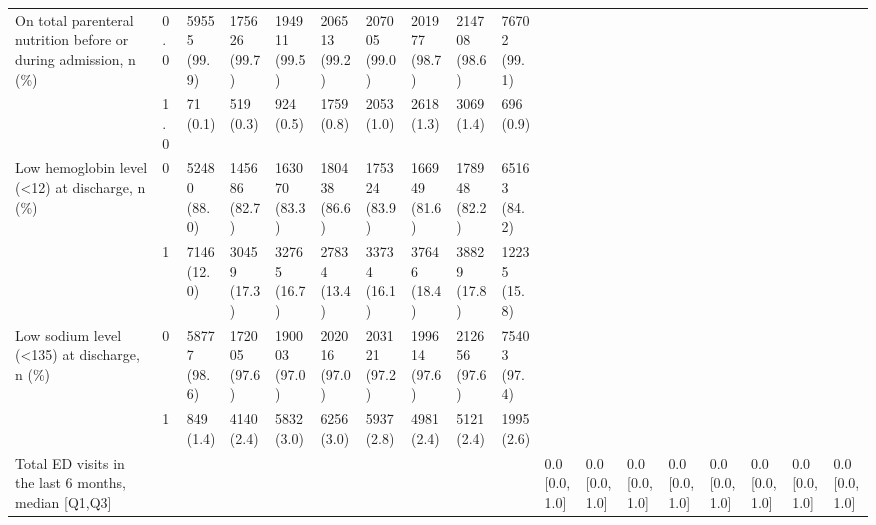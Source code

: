 \begin{tabular}{llllllllllllllllll}
On total parenteral nutrition before or during admission, n (\%) & 0.0 &                 59555 (99.9) &   175626 (99.7) &   194911 (99.5) &   206513 (99.2) &   207005 (99.0) &   201977 (98.7) &   214708 (98.6) &   76702 (99.1) &                   &                    &                    &                    &                    &                     &                     &                     \\
                                       & 1.0 &                     71 (0.1) &       519 (0.3) &       924 (0.5) &      1759 (0.8) &      2053 (1.0) &      2618 (1.3) &      3069 (1.4) &      696 (0.9) &                   &                    &                    &                    &                    &                     &                     &                     \\
Low hemoglobin level (<12) at discharge, n (\%) & 0 &                 52480 (88.0) &   145686 (82.7) &   163070 (83.3) &   180438 (86.6) &   175324 (83.9) &   166949 (81.6) &   178948 (82.2) &   65163 (84.2) &                   &                    &                    &                    &                    &                     &                     &                     \\
                                       & 1 &                  7146 (12.0) &    30459 (17.3) &    32765 (16.7) &    27834 (13.4) &    33734 (16.1) &    37646 (18.4) &    38829 (17.8) &   12235 (15.8) &                   &                    &                    &                    &                    &                     &                     &                     \\
Low sodium level (<135) at discharge, n (\%) & 0 &                 58777 (98.6) &   172005 (97.6) &   190003 (97.0) &   202016 (97.0) &   203121 (97.2) &   199614 (97.6) &   212656 (97.6) &   75403 (97.4) &                   &                    &                    &                    &                    &                     &                     &                     \\
                                       & 1 &                    849 (1.4) &      4140 (2.4) &      5832 (3.0) &      6256 (3.0) &      5937 (2.8) &      4981 (2.4) &      5121 (2.4) &     1995 (2.6) &                   &                    &                    &                    &                    &                     &                     &                     \\
Total ED visits in the last 6 months, median [Q1,Q3] &   &                              &                 &                 &                 &                 &                 &                 &                &     0.0 [0.0,1.0] &      0.0 [0.0,1.0] &      0.0 [0.0,1.0] &      0.0 [0.0,1.0] &      0.0 [0.0,1.0] &       0.0 [0.0,1.0] &       0.0 [0.0,1.0] &       0.0 [0.0,1.0] \\

\end{tabular}
